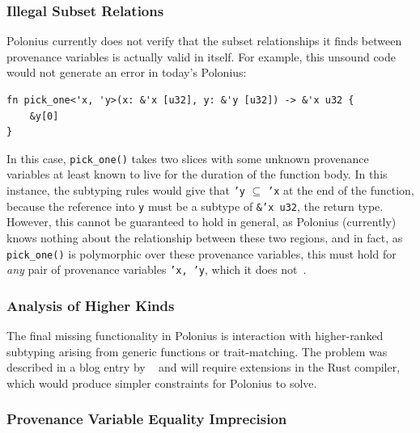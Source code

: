 \documentclass[11pt,a4paper,twoside,openany]{report}
\newcommand{\InRust}[1]{\texttt{#1}}
\begin{document}
\subsubsection{Illegal Subset Relations}
\label{sec:missing-features:illegal-subset-relations}

Polonius currently does not verify that the subset relationships it finds between
provenance variables is actually valid in itself. For example, this unsound code
would not generate an error in today's Polonius:
\begin{verbatim}
fn pick_one<'x, 'y>(x: &'x [u32], y: &'y [u32]) -> &'x u32 {
    &y[0]
}
\end{verbatim}

In this case, \InRust{pick_one()} takes two slices with some unknown provenance
variables at least known to live for the duration of the function body. In this
instance, the subtyping rules would give that \InRust{'y} $\subseteq$
\InRust{'x} at the end of the function, because the reference into \InRust{y}
must be a subtype of \InRust{&'x u32}, the return type. However, this cannot be
guaranteed to hold in general, as Polonius (currently) knows nothing about the
relationship between these two regions, and in fact, as \InRust{pick_one()} is
polymorphic over these provenance variables, this must hold for \emph{any} pair
of provenance variables \InRust{'x, 'y}, which it does
not~\cite{matsakis_polonius_2019-1}.

\subsubsection{Analysis of Higher Kinds}
\label{sec:missing-features:higher-kinds}

The final missing functionality in Polonius is interaction with higher-ranked
subtyping arising from generic functions or trait-matching. The problem was
described in a blog entry by
\citeauthor{matsakis_polonius_2019}~\cite{matsakis_polonius_2019} and will
require extensions in the Rust compiler, which would produce simpler constraints
for Polonius to solve.

\subsubsection{Provenance Variable Equality Imprecision}
\label{sec:missing-features:provenance-variable-equality}
\end{document}
